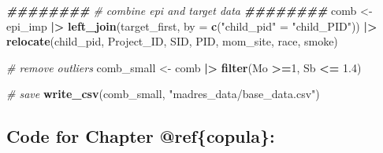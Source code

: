 \documentclass[12pt, twoside]{amherstthesis}
\newenvironment{Shaded}{\begin{snugshade}}{\end{snugshade}}
\newcommand{\AttributeTok}[1]{\textcolor[rgb]{0.13,0.29,0.53}{#1}}
\newcommand{\CommentTok}[1]{\textcolor[rgb]{0.56,0.35,0.01}{\textit{#1}}}
\newcommand{\DecValTok}[1]{\textcolor[rgb]{0.00,0.00,0.81}{#1}}
\newcommand{\DocumentationTok}[1]{\textcolor[rgb]{0.56,0.35,0.01}{\textbf{\textit{#1}}}}
\newcommand{\FloatTok}[1]{\textcolor[rgb]{0.00,0.00,0.81}{#1}}
\newcommand{\FunctionTok}[1]{\textcolor[rgb]{0.13,0.29,0.53}{\textbf{#1}}}
\newcommand{\NormalTok}[1]{#1}
\newcommand{\OtherTok}[1]{\textcolor[rgb]{0.56,0.35,0.01}{#1}}
\newcommand{\SpecialCharTok}[1]{\textcolor[rgb]{0.81,0.36,0.00}{\textbf{#1}}}
\newcommand{\StringTok}[1]{\textcolor[rgb]{0.31,0.60,0.02}{#1}}
\begin{document}
\begin{Shaded}
\begin{Highlighting}[]
\DocumentationTok{\#\#\#\#\#\#\#\#}
\CommentTok{\# combine epi and target data}
\DocumentationTok{\#\#\#\#\#\#\#\#}
\NormalTok{comb }\OtherTok{\textless{}{-}}\NormalTok{ epi\_imp }\SpecialCharTok{|\textgreater{}} 
  \FunctionTok{left\_join}\NormalTok{(target\_first, }\AttributeTok{by =} \FunctionTok{c}\NormalTok{(}\StringTok{"child\_pid"} \OtherTok{=} \StringTok{"child\_PID"}\NormalTok{)) }\SpecialCharTok{|\textgreater{}} 
  \FunctionTok{relocate}\NormalTok{(child\_pid, Project\_ID, SID, PID, mom\_site, race, smoke) }

\CommentTok{\# remove outliers}
\NormalTok{comb\_small }\OtherTok{\textless{}{-}}\NormalTok{ comb }\SpecialCharTok{|\textgreater{}} 
  \FunctionTok{filter}\NormalTok{(Mo }\SpecialCharTok{\textgreater{}=}\DecValTok{1}\NormalTok{, Sb }\SpecialCharTok{\textless{}=} \FloatTok{1.4}\NormalTok{)}

\CommentTok{\# save}
\FunctionTok{write\_csv}\NormalTok{(comb\_small, }\StringTok{"madres\_data/base\_data.csv"}\NormalTok{)}
\end{Highlighting}
\end{Shaded}
\hypertarget{code-for-chapter-refcopula}{%
\subsection{Code for Chapter @ref\{copula\}:}\label{code-for-chapter-refcopula}}
\end{document}
